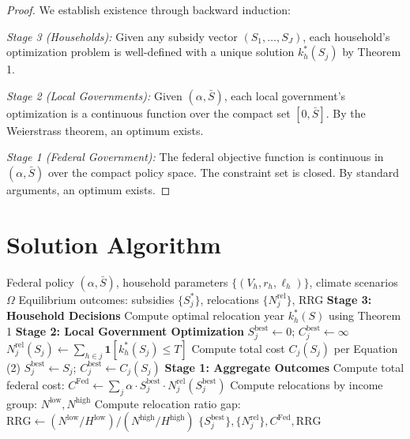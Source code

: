 \documentclass[11pt,letterpaper]{article}
\theoremstyle{definition}
\begin{document}
\begin{proof}
We establish existence through backward induction:

\textit{Stage 3 (Households):} Given any subsidy vector $(S_1, \ldots, S_J)$, each household's optimization problem is well-defined with a unique solution $k_h^*(S_j)$ by Theorem 1.

\textit{Stage 2 (Local Governments):} Given $(\alpha, \bar{S})$, each local government's optimization is a continuous function over the compact set $[0, \bar{S}]$. By the Weierstrass theorem, an optimum exists.

\textit{Stage 1 (Federal Government):} The federal objective function is continuous in $(\alpha, \bar{S})$ over the compact policy space. The constraint set is closed. By standard arguments, an optimum exists.
\end{proof}

\section{Solution Algorithm}
\label{app:algorithm}

\begin{algorithm}[H]
\caption{Backward Induction Solution for Three-Level Stackelberg Game}
\begin{algorithmic}[1]
\Require Federal policy $(\alpha, \bar{S})$, household parameters $\{(V_h, r_h, \ell_h)\}$, climate scenarios $\Omega$
\Ensure Equilibrium outcomes: subsidies $\{S_j^*\}$, relocations $\{N_j^{\text{rel}}\}$, RRG
\Statex
\Statex \textbf{Stage 3: Household Decisions}
        \State Compute optimal relocation year $k_h^*(S)$ using Theorem 1
    \EndFor
\EndFor
\Statex
\Statex \textbf{Stage 2: Local Government Optimization}
    \State $S_j^{\text{best}} \gets 0$; \quad $C_j^{\text{best}} \gets \infty$
        \State $N_j^{\text{rel}}(S_j) \gets \sum_{h \in j} \mathbf{1}[k_h^*(S_j) \leq T]$
        \State Compute total cost $C_j(S_j)$ per Equation (2)
            \State $S_j^{\text{best}} \gets S_j$; \quad $C_j^{\text{best}} \gets C_j(S_j)$
        \EndIf
    \EndFor
\EndFor
\Statex
\Statex \textbf{Stage 1: Aggregate Outcomes}
\State Compute total federal cost: $C^{\text{Fed}} \gets \sum_j \alpha \cdot S_j^{\text{best}} \cdot N_j^{\text{rel}}(S_j^{\text{best}})$
\State Compute relocations by income group: $N^{\text{low}}, N^{\text{high}}$
\State Compute relocation ratio gap: $\text{RRG} \gets (N^{\text{low}}/H^{\text{low}}) / (N^{\text{high}}/H^{\text{high}})$
\State \Return $\{S_j^{\text{best}}\}, \{N_j^{\text{rel}}\}, C^{\text{Fed}}, \text{RRG}$
\end{algorithmic}
\end{algorithm}
\end{document}
